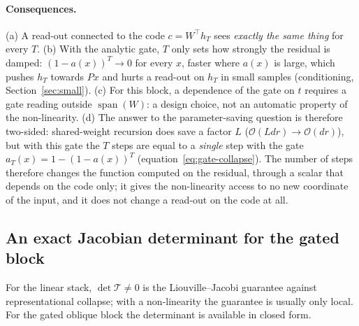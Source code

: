 \documentclass[11pt,a4paper]{article}
\theoremstyle{plain}
\theoremstyle{definition}
\theoremstyle{remark}
\newcommand{\spn}{\operatorname{span}}
\newcommand{\T}{\top}
\begin{document}
\paragraph{Consequences.} (a) A read-out connected to the code $c=W^\T h_T$
sees \emph{exactly the same thing} for every $T$. (b) With the analytic
gate, $T$ only sets how strongly the residual is damped: $(1-a(x))^T\to0$
for every $x$, faster where $a(x)$ is large, which pushes $h_T$ towards $Px$
and hurts a read-out on $h_T$ in small samples (conditioning,
Section~\ref{sec:small}). (c) For this block, a dependence of the gate on $t$
requires a gate reading outside $\spn(W)$: a design choice, not an automatic
property of the non-linearity. (d) The answer to the parameter-saving
question is therefore two-sided: shared-weight recursion does save a factor
$L$ ($\mathcal O(Ldr)\to\mathcal O(dr)$), but with this gate the $T$ steps
are equal to a \emph{single} step with the gate $a_T(x)=1-(1-a(x))^T$
(equation~\eqref{eq:gate-collapse}). The number of steps therefore changes
the function computed on the residual, through a scalar that depends on the
code only; it gives the non-linearity access to no new coordinate of the
input, and it does not change a read-out on the code at all.

\subsection{An exact Jacobian determinant for the gated block}
For the linear stack, $\det\mathcal T\neq0$ is the Liouville--Jacobi
guarantee against representational collapse; with a non-linearity the
guarantee is usually only local. For the gated oblique block the
determinant is available in closed form.
\end{document}
